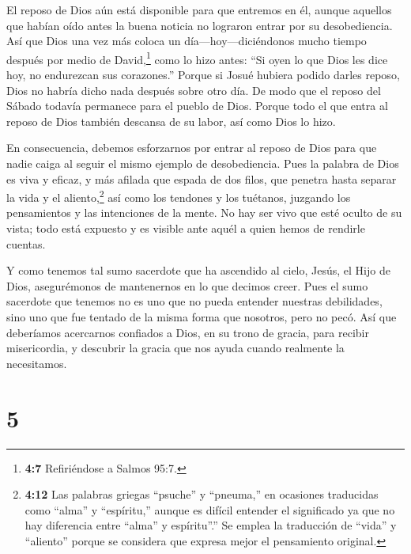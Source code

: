  El reposo de Dios aún está disponible para que entremos en
él, aunque aquellos que habían oído antes la buena noticia no lograron
entrar por su desobediencia.  Así que Dios una vez más
coloca un día---hoy---diciéndonos mucho tiempo después por medio de
David,\footnote{\textbf{4:7} Refiriéndose a Salmos 95:7.} como lo hizo
antes: ``Si oyen lo que Dios les dice hoy, no endurezcan sus
corazones.''  Porque si Josué hubiera podido darles reposo,
Dios no habría dicho nada después sobre otro día.  De modo
que el reposo del Sábado todavía permanece para el pueblo de Dios.
 Porque todo el que entra al reposo de Dios también
descansa de su labor, así como Dios lo hizo.

 En consecuencia, debemos esforzarnos por entrar al reposo
de Dios para que nadie caiga al seguir el mismo ejemplo de
desobediencia.  Pues la palabra de Dios es viva y eficaz, y
más afilada que espada de dos filos, que penetra hasta separar la vida y
el aliento,\footnote{\textbf{4:12} Las palabras griegas ``psuche'' y
  ``pneuma,'' en ocasiones traducidas como ``alma'' y ``espíritu,''
  aunque es difícil entender el significado ya que no hay diferencia
  entre ``alma'' y espíritu''.'' Se emplea la traducción de ``vida'' y
  ``aliento'' porque se considera que expresa mejor el pensamiento
  original.} así como los tendones y los tuétanos, juzgando los
pensamientos y las intenciones de la mente.  No hay ser
vivo que esté oculto de su vista; todo está expuesto y es visible ante
aquél a quien hemos de rendirle cuentas.

 Y como tenemos tal sumo sacerdote que ha ascendido al
cielo, Jesús, el Hijo de Dios, asegurémonos de mantenernos en lo que
decimos creer.  Pues el sumo sacerdote que tenemos no es
uno que no pueda entender nuestras debilidades, sino uno que fue tentado
de la misma forma que nosotros, pero no pecó.  Así que
deberíamos acercarnos confiados a Dios, en su trono de gracia, para
recibir misericordia, y descubrir la gracia que nos ayuda cuando
realmente la necesitamos.

\hypertarget{section-4}{%
\section{5}\label{section-4}}

